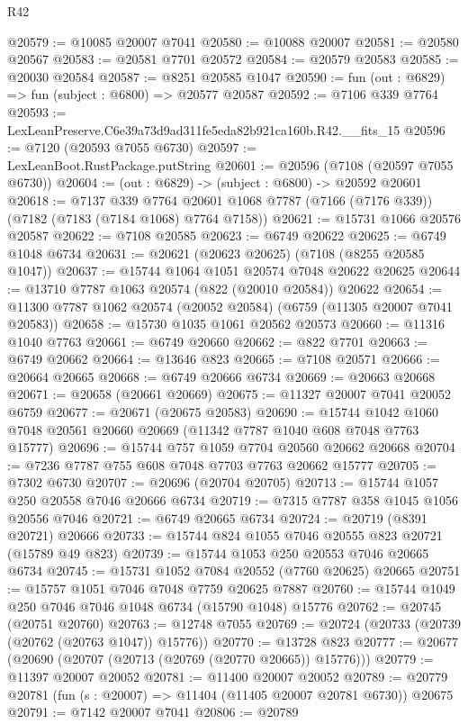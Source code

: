 \begin{lexlean}{R42}
\begin{coremodule}
{@20579 := @10085 @20007 @7041
@20580 := @10088 @20007
@20581 := @20580 @20567
@20583 := @20581 @7701 @20572
@20584 := @20579 @20583
@20585 := @20030 @20584
@20587 := @8251 @20585 @1047
@20590 := fun (out : @6829) => fun (subject : @6800) => @20577 @20587
@20592 := @7106 @339 @7764
@20593 := LexLeanPreserve.C6e39a73d9ad311fe5eda82b921ca160b.R42.__fits_15
@20596 := @7120 (@20593 @7055 @6730)
@20597 := LexLeanBoot.RustPackage.putString
@20601 := @20596 (@7108 (@20597 @7055 @6730))
@20604 := (out : @6829) -> (subject : @6800) -> @20592 @20601
@20618 := @7137
    @339
    @7764
    @20601
    @1068
    @7787
    (@7166 (@7176 @339))
    (@7182 (@7183 (@7184 @1068) @7764 @7158))
@20621 := @15731 @1066 @20576 @20587
@20622 := @7108 @20585
@20623 := @6749 @20622
@20625 := @6749 @1048 @6734
@20631 := @20621 (@20623 @20625) (@7108 (@8255 @20585 @1047))
@20637 := @15744 @1064 @1051 @20574 @7048 @20622 @20625
@20644 := @13710 @7787 @1063 @20574 (@822 (@20010 @20584)) @20622
@20654 := @11300 @7787 @1062 @20574 (@20052 @20584) (@6759 (@11305 @20007 @7041 @20583))
@20658 := @15730 @1035 @1061 @20562 @20573
@20660 := @11316 @1040 @7763
@20661 := @6749 @20660
@20662 := @822 @7701
@20663 := @6749 @20662
@20664 := @13646 @823
@20665 := @7108 @20571
@20666 := @20664 @20665
@20668 := @6749 @20666 @6734
@20669 := @20663 @20668
@20671 := @20658 (@20661 @20669)
@20675 := @11327 @20007 @7041 @20052 @6759
@20677 := @20671 (@20675 @20583)
@20690 := @15744 @1042 @1060 @7048 @20561 @20660 @20669 (@11342 @7787 @1040 @608 @7048 @7763 @15777)
@20696 := @15744 @757 @1059 @7704 @20560 @20662 @20668
@20704 := @7236 @7787 @755 @608 @7048 @7703 @7763 @20662 @15777
@20705 := @7302 @6730
@20707 := @20696 (@20704 @20705)
@20713 := @15744 @1057 @250 @20558 @7046 @20666 @6734
@20719 := @7315 @7787 @358 @1045 @1056 @20556 @7046
@20721 := @6749 @20665 @6734
@20724 := @20719 (@8391 @20721) @20666
@20733 := @15744 @824 @1055 @7046 @20555 @823 @20721 (@15789 @49 @823)
@20739 := @15744 @1053 @250 @20553 @7046 @20665 @6734
@20745 := @15731 @1052 @7084 @20552 (@7760 @20625) @20665
@20751 := @15757 @1051 @7046 @7048 @7759 @20625 @7887
@20760 := @15744 @1049 @250 @7046 @7046 @1048 @6734 (@15790 @1048) @15776
@20762 := @20745 (@20751 @20760)
@20763 := @12748 @7055
@20769 := @20724 (@20733 (@20739 (@20762 (@20763 @1047)) @15776))
@20770 := @13728 @823
@20777 := @20677 (@20690 (@20707 (@20713 (@20769 (@20770 @20665)) @15776)))
@20779 := @11397 @20007 @20052
@20781 := @11400 @20007 @20052
@20789 := @20779 @20781 (fun (s : @20007) => @11404 (@11405 @20007 @20781 @6730)) @20675
@20791 := @7142 @20007 @7041
@20806 := @20789
}
\end{coremodule}
\end{lexlean}
